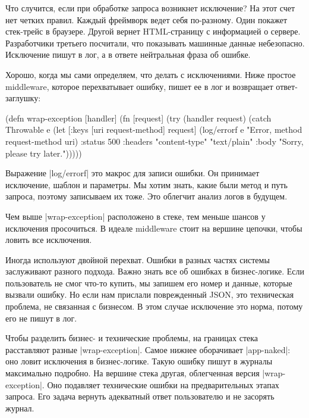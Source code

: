Что случится, если при обработке запроса возникнет исключение? На этот счет нет
четких правил. Каждый фреймворк ведет себя по-разному. Один покажет стек-трейс в
браузере. Другой вернет HTML-страницу с информацией о сервере. Разработчики
третьего посчитали, что показывать машинные данные небезопасно. Исключение пишут
в лог, а в ответе нейтральная фраза об ошибке.

Хорошо, когда мы сами определяем, что делать с исключениями. Ниже простое
middleware, которое перехватывает ошибку, пишет ее в лог и возвращает
ответ-заглушку:

\begin{english}
  \begin{clojure}
(defn wrap-exception [handler]
  (fn [request]
    (try
      (handler request)
      (catch Throwable e
        (let [{:keys [uri
                      request-method]} request]
          (log/errorf e "Error, method %
                      request-method uri)
          {:status 500
           :headers {"content-type" "text/plain"}
           :body "Sorry, please try later."})))))
  \end{clojure}
\end{english}

Выражение \spverb|log/errorf| это макрос для записи ошибки. Он принимает
исключение, шаблон и параметры. Мы хотим знать, какие были метод и путь запроса,
поэтому записываем их тоже. Это облегчит анализ логов в будущем.

Чем выше \spverb|wrap-exception| расположено в стеке, тем меньше шансов у
исключения просочиться. В идеале middleware стоит на вершине цепочки, чтобы
ловить все исключения.

Иногда используют двойной перехват. Ошибки в разных частях системы заслуживают
разного подхода. Важно знать все об ошибках в бизнес-логике. Если пользователь
не смог что-то купить, мы запишем его номер и данные, которые вызвали ошибку. Но
если нам прислали поврежденный JSON, это техническая проблема, не связанная с
бизнесом. В этом случае исключение это норма, потому его не пишут в лог.

Чтобы разделить бизнес- и технические проблемы, на границах стека расставляют
разные \spverb|wrap-exception|. Самое нижнее оборачивает \spverb|app-naked|: оно
ловит исключения в бизнес-логике. Такую ошибку пишут в журналы максимально
подробно. На вершине стека другая, облегченная версия \spverb|wrap-exception|.
Оно подавляет технические ошибки на предварительных этапах запроса. Его задача
вернуть адекватный ответ пользователю и не засорять журнал.


